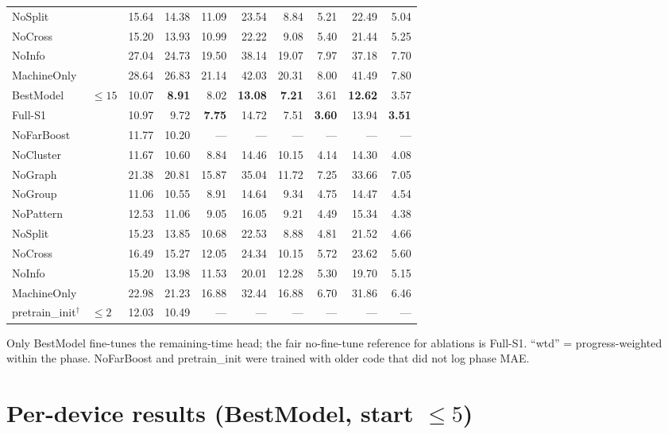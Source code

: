 \documentclass[9pt,a4paper,twocolumn]{extarticle}
\begin{document}
\begin{table}[tp]
\begin{tabular}{llrrrrrrrr}
NoSplit &  & 15.64 & 14.38 & 11.09 & 23.54 & 8.84 & 5.21 & 22.49 & 5.04 \\
NoCross &  & 15.20 & 13.93 & 10.99 & 22.22 & 9.08 & 5.40 & 21.44 & 5.25 \\
NoInfo &  & 27.04 & 24.73 & 19.50 & 38.14 & 19.07 & 7.97 & 37.18 & 7.70 \\
MachineOnly &  & 28.64 & 26.83 & 21.14 & 42.03 & 20.31 & 8.00 & 41.49 & 7.80 \\
\midrule
BestModel & $\le 15$ & 10.07 & \textbf{8.91} & 8.02 & \textbf{13.08} & \textbf{7.21} & 3.61 & \textbf{12.62} & 3.57 \\
Full-S1 &  & 10.97 & 9.72 & \textbf{7.75} & 14.72 & 7.51 & \textbf{3.60} & 13.94 & \textbf{3.51} \\
NoFarBoost &  & 11.77 & 10.20 & --- & --- & --- & --- & --- & --- \\
NoCluster &  & 11.67 & 10.60 & 8.84 & 14.46 & 10.15 & 4.14 & 14.30 & 4.08 \\
NoGraph &  & 21.38 & 20.81 & 15.87 & 35.04 & 11.72 & 7.25 & 33.66 & 7.05 \\
NoGroup &  & 11.06 & 10.55 & 8.91 & 14.64 & 9.34 & 4.75 & 14.47 & 4.54 \\
NoPattern &  & 12.53 & 11.06 & 9.05 & 16.05 & 9.21 & 4.49 & 15.34 & 4.38 \\
NoSplit &  & 15.23 & 13.85 & 10.68 & 22.53 & 8.88 & 4.81 & 21.52 & 4.66 \\
NoCross &  & 16.49 & 15.27 & 12.05 & 24.34 & 10.15 & 5.72 & 23.62 & 5.60 \\
NoInfo &  & 15.20 & 13.98 & 11.53 & 20.01 & 12.28 & 5.30 & 19.70 & 5.15 \\
MachineOnly &  & 22.98 & 21.23 & 16.88 & 32.44 & 16.88 & 6.70 & 31.86 & 6.46 \\
\midrule
pretrain\_init$^\dagger$ & $\le 2$ & 12.03 & 10.49 & --- & --- & --- & --- & --- & --- \\
\bottomrule
\end{tabular}
\par\smallskip\parbox{\textwidth}{\scriptsize Only BestModel fine-tunes the remaining-time head; the fair no-fine-tune reference for ablations is Full-S1. ``wtd'' = progress-weighted within the phase. NoFarBoost and pretrain\_init were trained with older code that did not log phase MAE.}
\end{table}

\section*{Per-device results (BestModel, start $\le 5$)}
\end{document}
